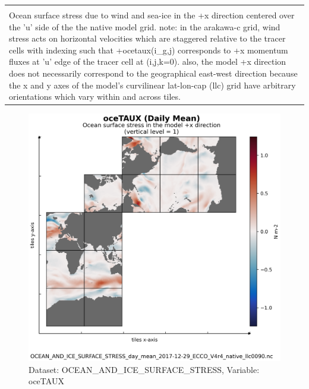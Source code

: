 \begin{longtable}{|m{}|m{}|m{}|m{}|}
{{{{{}}}}} \\ \hline
\rowcolor{lightgray} \multicolumn{4}{|c|}{\textbf{Comments}} \\ \hline
\multicolumn{4}{|p{1\textwidth}|}{\footnotesize{{Ocean surface stress due to wind and sea-ice in the +x direction centered over the 'u' side of the the native model grid. note: in the arakawa-c grid, wind stress acts on horizontal velocities which are staggered relative to the tracer cells with indexing such that +ocetaux(i\_g,j) corresponds to +x momentum fluxes at 'u' edge of the tracer cell at (i,j,k=0). also, the model +x direction does not necessarily correspond to the geographical east-west direction because the x and y axes of the model's curvilinear lat-lon-cap (llc) grid have arbitrary orientations which vary within and across tiles.}}} \\ \hline
\end{longtable}

\begin{figure}[H]
\centering
\includegraphics[scale=0.55]{../images/plots/v4r4/native_plots/Ocean_and_Sea-Ice_Surface_Stress/oceTAUX.png}
\caption{Dataset: OCEAN\_AND\_ICE\_SURFACE\_STRESS, Variable: oceTAUX}
\label{tab:table-OCEAN_AND_ICE_SURFACE_STRESS_oceTAUX-Plot}
\end{figure}
\newpage
\pagebreak
